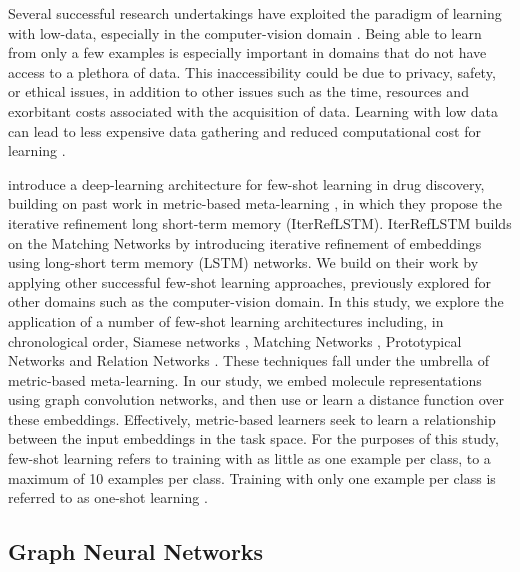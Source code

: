 Several successful research undertakings have exploited the paradigm of learning with low-data, especially in the computer-vision domain \cite{koch2015siamese, vinyals2016matching, snell2017prototypical, sung2018learning}. Being able to learn from only a few examples is especially important in domains that do not have access to a plethora of data. This inaccessibility could be due to privacy, safety, or ethical issues, in addition to other issues such as the time, resources and exorbitant costs associated with the acquisition of data. Learning with low data can lead to less expensive data gathering and reduced computational cost for learning \cite{wang2020generalizing}.

\citet{altae2017low} introduce a deep-learning architecture for few-shot learning in drug discovery, building on past work in metric-based meta-learning \cite{vinyals2016matching}, in which they propose the iterative refinement long short-term memory (IterRefLSTM). IterRefLSTM builds on the Matching Networks \cite{vinyals2016matching} by introducing iterative refinement of embeddings using long-short term memory (LSTM) networks. We build on their work by applying other successful few-shot learning approaches, previously explored for other domains such as the computer-vision domain. In this study, we explore the application of a number of few-shot learning architectures including, in chronological order, Siamese networks \citep{koch2015siamese}, Matching Networks \citep{vinyals2016matching}, Prototypical Networks \citep{snell2017prototypical} and Relation Networks \citep{sung2018learning}. These techniques fall under the umbrella of metric-based meta-learning. In our study, we embed molecule representations using graph convolution networks, and then use or learn a distance function over these embeddings. Effectively, metric-based learners seek to learn a relationship between the input embeddings in the task space. For the purposes of this study, few-shot learning refers to training with as little as one example per class, to a maximum of 10 examples per class. Training with only one example per class is referred to as one-shot learning \citep{koch2015siamese, vinyals2016matching}.

\subsection{Graph Neural Networks}

